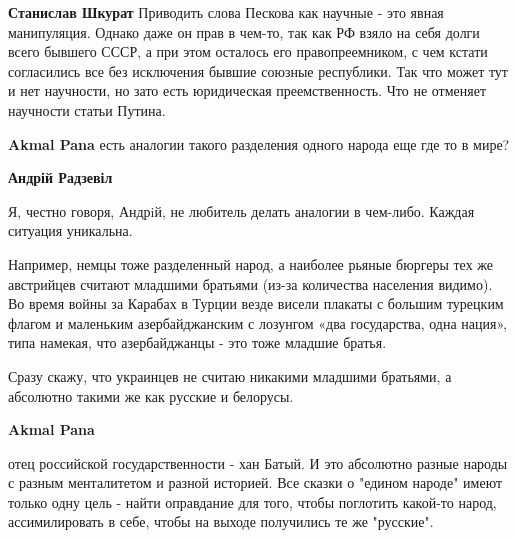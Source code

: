 \begin{itemize}
\begin{itemize}
\textbf{Станислав Шкурат} Приводить слова Пескова как научные - это явная манипуляция.
Однако даже он прав в чем-то, так как РФ взяло на себя долги всего бывшего
СССР, а при этом осталось его правопреемником, с чем кстати согласились все без
исключения бывшие союзные республики. Так что может тут и нет научности, но
зато есть юридическая преемственность. Что не отменяет научности статьи Путина.

 
\textbf{Akmal Pana} есть аналогии такого разделения одного народа еще где то в мире?

 
\textbf{Андрій Радзевіл} 

Я, честно говоря, Андрiй, не любитель делать аналогии в чем-либо. Каждая
ситуация уникальна.

Например, немцы тоже разделенный народ, а наиболее рьяные бюргеры тех же
австрийцев считают младшими братьями (из-за количества населения видимо). Во
время войны за Карабах в Турции везде висели плакаты с большим турецким флагом
и маленьким азербайджанским с лозунгом «два государства, одна нация», типа
намекая, что азербайджанцы - это тоже младшие братья.

Сразу скажу, что украинцев не считаю никакими младшими братьями, а абсолютно
такими же как русские и белорусы.

 
\textbf{Akmal Pana} 

отец российской государственности - хан Батый. И это абсолютно разные народы с
разным менталитетом и разной историей. Все сказки о "едином народе" имеют
только одну цель - найти оправдание для того, чтобы поглотить какой-то народ,
ассимилировать в себе, чтобы на выходе получились те же "русские".

 

\end{itemize}
\end{itemize}
